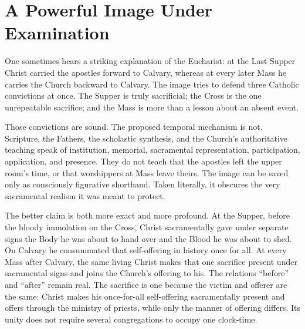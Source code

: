 
\section{A Powerful Image Under Examination}

One sometimes hears a striking explanation of the Eucharist: at the Last
Supper Christ carried the apostles forward to Calvary, whereas at every later
Mass he carries the Church backward to Calvary. The image tries to defend
three Catholic convictions at once. The Supper is truly sacrificial; the Cross
is the one unrepeatable sacrifice; and the Mass is more than a lesson about an
absent event.

Those convictions are sound. The proposed temporal mechanism is not. Scripture,
the Fathers, the scholastic synthesis, and the Church's authoritative teaching
speak of institution, memorial, sacramental representation, participation,
application, and presence. They do not teach that the apostles left the upper
room's time, or that worshippers at Mass leave theirs. The image can be saved
only as consciously figurative shorthand. Taken literally, it obscures the
very sacramental realism it was meant to protect.

The better claim is both more exact and more profound. At the Supper,
before the bloody immolation on the Cross, Christ sacramentally gave under
separate signs the Body he was about to hand over and the Blood he was about
to shed. On Calvary he consummated that self-offering in history once for all.
At every Mass after Calvary, the same living Christ makes that one sacrifice
present under sacramental signs and joins the Church's offering to his. The
relations ``before'' and ``after'' remain real. The sacrifice is one because
the victim and offerer are the same: Christ makes his once-for-all
self-offering sacramentally present and offers through the ministry of priests,
while only the manner of offering differs. Its unity does not require several
congregations to occupy one clock-time.

